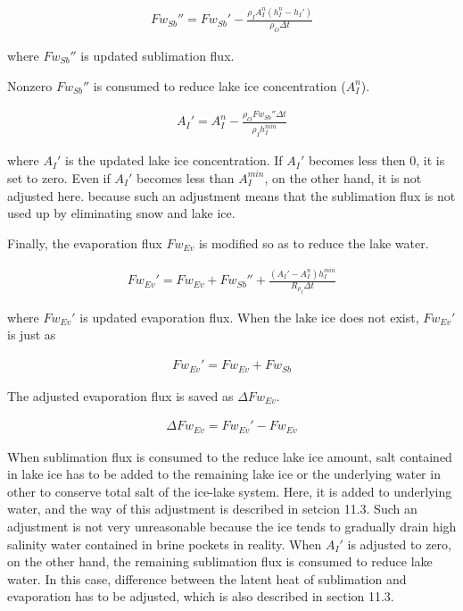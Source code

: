 \begin{eqnarray}
    Fw_{Sb}'' = Fw_{Sb}' - \frac{\rho_I  A_I^n (h_I^n-h_I')}{\rho_O\Delta t}
\end{eqnarray}

where \(Fw_{Sb}''\) is updated sublimation flux.

Nonzero \(Fw_{Sb}''\) is consumed to reduce lake ice concentration (\(A_I^n\)).

\begin{eqnarray}
    A_I' = A_I^n - \frac{\rho_OFw_{Sb}'' \Delta t }{\rho_Ih_I^{min}}
\end{eqnarray}

where \(A_I'\) is the updated lake ice concentration. If \(A_I'\) becomes less then 0, it is set to zero. Even if \(A_I'\) becomes less than \(A_I^{min}\), on the other hand, it is not adjusted here.
because such an adjustment means that the sublimation flux is not used up by eliminating snow and lake ice.

Finally, the evaporation flux \(Fw_{Ev}\) is modified so as to reduce the lake water.

\begin{eqnarray}
    Fw_{Ev}' = Fw_{Ev} + Fw_{Sb}'' + \frac{(A_I'-A_I^n) h_I^{min}}{R_{\rho_I}\Delta t}
\end{eqnarray}

where \(Fw_{Ev}'\) is updated evaporation flux. When the lake ice does not exist, \(Fw_{Ev}'\) is just as

\begin{eqnarray}
    Fw_{Ev}' = Fw_{Ev} + Fw_{Sb}
\end{eqnarray}

The adjusted evaporation flux is saved as \(\Delta Fw_{Ev}\).

\begin{eqnarray}
    \Delta Fw_{Ev} = Fw_{Ev}' - Fw_{Ev}
\end{eqnarray}

When sublimation flux is consumed to the reduce lake ice amount, salt contained in lake ice has to be added to the remaining lake ice or the underlying water in other to conserve total salt of the
ice-lake system. Here, it is added to underlying water, and the way of this adjustment is described in setcion 11.3. Such an adjustment is not very unreasonable because the ice tends to gradually
drain high salinity water contained in brine pockets in reality. When \(A_I'\) is adjusted to zero, on the other hand, the remaining sublimation flux is consumed to reduce lake water. In this case,
difference between the latent heat of sublimation and evaporation has to be adjusted, which is also described in section 11.3.

